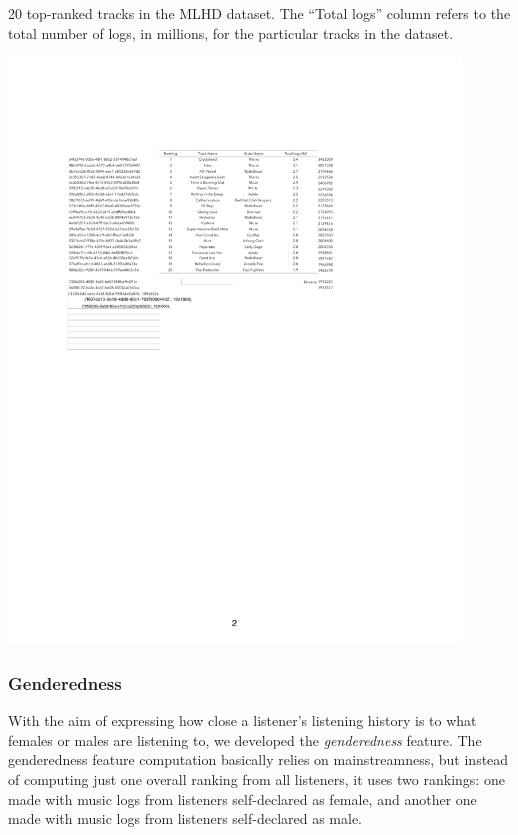 \graphicspath{{./figs/ch6/}}
\begin{table}[!h]

\centering
\caption[20 top-ranked tracks in the MLHD dataset]{20 top-ranked tracks in the MLHD dataset. The ``Total logs'' column refers to the total number of logs, in millions, for the particular tracks in the dataset.}\label{table:track_ranking}
\includegraphics[width = 0.9\textwidth]{ranking_track_cropped.pdf}
\vspace{1em}
\end{table}




\subsubsection{Genderedness}\label{subsec:genderedness}
	With the aim of expressing how close a listener's listening history is to what females or males are listening to, we developed the \emph{genderedness} feature. 
    The genderedness feature computation basically relies on mainstreamness, but instead of computing just one overall ranking from all listeners, it uses two rankings: one made with music logs from listeners self-declared as female, and another one made with music logs from listeners self-declared as male. 

